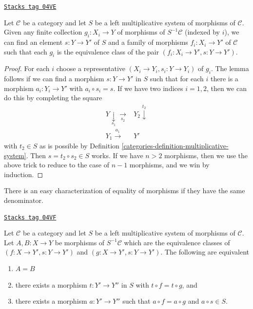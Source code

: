 \begin{lemma}
\label{categories-lemma-morphisms-left-localization}
\href{https://stacks.math.columbia.edu/tag/04VE}{\texttt{Stacks tag 04VE}}

Let $\mathcal{C}$ be a category and let $S$ be a left multiplicative
system of morphisms of $\mathcal{C}$. Given any finite collection
$g_i : X_i \to Y$ of morphisms of $S^{-1}\mathcal{C}$
(indexed by $i$),
we can find an element $s : Y \to Y'$ of $S$ and
a family of morphisms $f_i : X_i \to Y'$ of $\mathcal{C}$ such that
each $g_i$ is the equivalence class of the pair
$(f_i : X_i \to Y', s : Y \to Y')$.
\end{lemma}

\begin{proof}

For each $i$ choose a representative $(X_i \to Y_i, s_i : Y \to Y_i)$
of $g_i$.
The lemma follows if we can find a morphism $s : Y \to Y'$ in $S$ such that
for each $i$ there is a morphism $a_i : Y_i \to Y'$ with
$a_i \circ s_i = s$. If we have two indices $i = 1, 2$, then we can
do this by completing the square
$$
\begin{array}{cc}Y \underset{s_1}{\downarrow}\underset{s_2}{\longrightarrow} & Y_2 \overset{t_2}{\downarrow} \\ Y_1 \overset{a_1}{\longrightarrow} & Y'\end{array}
$$
with $t_2 \in S$ as is possible by
Definition \ref{categories-definition-multiplicative-system}.
Then $s = t_2 \circ s_2 \in S$ works.
If we have $n > 2$ morphisms, then we use the above trick to reduce
to the case of $n - 1$ morphisms, and we win by induction.
\end{proof}

There is an easy characterization of equality of morphisms if they
have the same denominator.

\begin{lemma}
\label{categories-lemma-equality-morphisms-left-localization}
\href{https://stacks.math.columbia.edu/tag/04VF}{\texttt{Stacks tag 04VF}}

Let $\mathcal{C}$ be a category and let $S$ be a left multiplicative
system of morphisms of $\mathcal{C}$. Let $A, B : X \to Y$ be morphisms
of $S^{-1}\mathcal{C}$ which are the equivalence classes of
$(f : X \to Y', s : Y \to Y')$ and $(g : X \to Y', s : Y \to Y')$.
The following are equivalent
\begin{enumerate}
\item $A = B$
\item there exists a morphism $t : Y' \to Y''$
in $S$ with $t \circ f = t \circ g$, and
\item there exists a morphism $a : Y' \to Y''$
such that $a \circ f = a \circ g$ and $a \circ s \in S$.
\end{enumerate}
\end{lemma}

